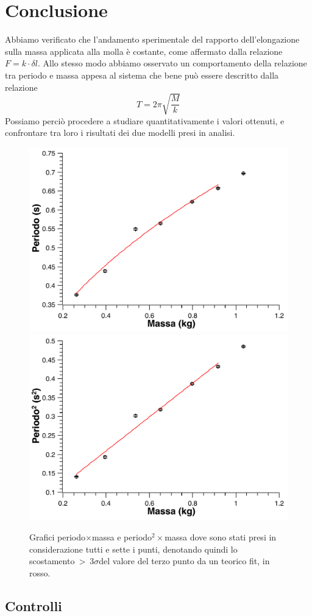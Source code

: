 \documentclass[italian, a4paper, 10pt, twocolumn]{../../style/lab_unige}
\newcommand{\treSigma}{$3\sigma$\space}
\newcommand{\hookeLaw}{$F=k\cdot\delta l$\space}
\begin{document}
{    

    \section{Conclusione}
    \label{section:conclusion}

    Abbiamo verificato che l'andamento sperimentale del rapporto dell'elongazione sulla massa applicata alla molla 
    è costante, come affermato dalla relazione \hookeLaw.
    Allo stesso modo abbiamo osservato un comportamento della relazione tra periodo e massa appesa al sistema che 
    bene può essere descritto dalla relazione
    \[
        T = 2\pi \sqrt{\frac{M}{k}}  
    \]
    Possiamo perciò procedere a studiare quantitativamente i valori ottenuti, e confrontare tra loro i risultati 
    dei due modelli presi in analisi.

    

    \begin{figure}
        \centering
        \includegraphics[width=0.45\linewidth]{plot_dyn_2.pdf}
        \includegraphics[width=0.45\linewidth]{plot_dyn_lin_2.pdf}
        \caption{Grafici periodo$\times$massa e periodo$^2\times$massa dove sono stati presi in considerazione 
        tutti e sette i punti, denotando quindi lo scostamento~>~\treSigma del valore del terzo punto da un teorico 
        fit, in rosso.}
        \label{figure:plot_2}
    \end{figure}

    \setcounter{table}{0}
    \renewcommand{\thetable}{A\arabic{table}}
    

    \subsection{Controlli}

}
\end{document}
